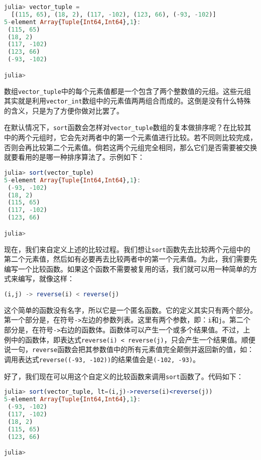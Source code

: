 \begin{lstlisting}[language=julia]
julia> vector_tuple = 
  [(115, 65), (18, 2), (117, -102), (123, 66), (-93, -102)]
5-element Array{Tuple{Int64,Int64},1}:
 (115, 65)  
 (18, 2)    
 (117, -102)
 (123, 66)  
 (-93, -102)

julia> 
\end{lstlisting}

数组\verb|vector_tuple|中的每个元素值都是一个包含了两个整数值的元组。这些元组其实就是利用\verb|vector_int|数组中的元素值两两组合而成的。这倒是没有什么特殊的含义，只是为了方便你做对比罢了。

在默认情况下，\verb|sort|函数会怎样对\verb|vector_tuple|数组的复本做排序呢？在比较其中的两个元组时，它会先对两者中的第一个元素值进行比较。若不同则比较完成，否则会再比较第二个元素值。倘若这两个元组完全相同，那么它们是否需要被交换就要看用的是哪一种排序算法了。示例如下：

\begin{lstlisting}[language=julia]
julia> sort(vector_tuple)
5-element Array{Tuple{Int64,Int64},1}:
 (-93, -102)
 (18, 2)    
 (115, 65)  
 (117, -102)
 (123, 66)  

julia> 
\end{lstlisting}

现在，我们来自定义上述的比较过程。我们想让\verb|sort|函数先去比较两个元组中的第二个元素值，然后如有必要再去比较两者中的第一个元素值。为此，我们需要先编写一个比较函数。如果这个函数不需要被复用的话，我们就可以用一种简单的方式来编写，就像这样：

\begin{lstlisting}[language=julia]
(i,j) -> reverse(i) < reverse(j)
\end{lstlisting}

这个简单的函数没有名字，所以它是一个匿名函数。它的定义其实只有两个部分。第一个部分是，在符号\verb|->|左边的参数列表。这里有两个参数，即：\verb|i|和\verb|j|。第二个部分是，在符号\verb|->|右边的函数体。函数体可以产生一个或多个结果值。不过，上例中的函数体，即表达式\verb|reverse(i) < reverse(j)|，只会产生一个结果值。顺便说一句，\verb|reverse|函数会把其参数值中的所有元素值完全颠倒并返回新的值，如：调用表达式\verb|reverse((-93, -102))|的结果值会是\verb|(-102, -93)|。

好了，我们现在可以用这个自定义的比较函数来调用\verb|sort|函数了。代码如下：

\begin{lstlisting}[language=julia]
julia> sort(vector_tuple, lt=(i,j)->reverse(i)<reverse(j))
5-element Array{Tuple{Int64,Int64},1}:
 (-93, -102)
 (117, -102)
 (18, 2)    
 (115, 65)  
 (123, 66)  

julia> 
\end{lstlisting}

